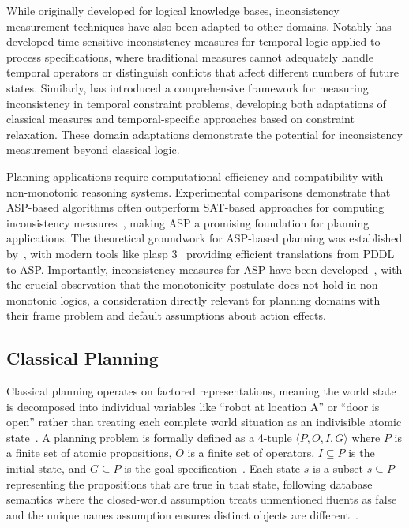 \documentclass[proposal,english,palatino]{AIGpaper}
\begin{document}
While originally developed for logical knowledge bases, inconsistency measurement techniques have also been adapted to other domains. Notably \cite{Corea2022} has developed time-sensitive inconsistency measures for temporal logic applied to process specifications, where traditional measures cannot adequately handle temporal operators or distinguish conflicts that affect different numbers of future states. Similarly, \cite{Condotta2024} has introduced a comprehensive framework for measuring inconsistency in temporal constraint problems, developing both adaptations of classical measures and temporal-specific approaches based on constraint relaxation. These domain adaptations demonstrate the potential for inconsistency measurement beyond classical logic.

Planning applications require computational efficiency and compatibility with non-monotonic reasoning systems. Experimental comparisons demonstrate that \ac{ASP}-based algorithms often outperform \ac{SAT}-based approaches for computing inconsistency measures~\cite{Kuhlmann2025}, making \ac{ASP} a promising foundation for planning applications. The theoretical groundwork for \ac{ASP}-based planning was established by~\cite{Dimopoulos1997}, with modern tools like plasp 3~\cite{Dimopoulos2019} providing efficient translations from \ac{PDDL} to \ac{ASP}. Importantly, inconsistency measures for \ac{ASP} have been developed~\cite{Ulbricht2016}, with the crucial observation that the monotonicity postulate does not hold in non-monotonic logics, a consideration directly relevant for planning domains with their frame problem and default assumptions about action effects.

\subsection{Classical Planning}

Classical planning operates on factored representations, meaning the world state is decomposed into individual variables like ``robot at location A'' or ``door is open'' rather than treating each complete world situation as an indivisible atomic state~\cite{Russell2016}. A planning problem is formally defined as a 4-tuple $\langle P, O, I, G \rangle$ where $P$ is a finite set of atomic propositions, $O$ is a finite set of operators, $I \subseteq P$ is the initial state, and $G \subseteq P$ is the goal specification~\cite{Bylander1994}. Each state $s$ is a subset $s \subseteq P$ representing the propositions that are true in that state, following database semantics where the closed-world assumption treats unmentioned fluents as false and the unique names assumption ensures distinct objects are different~\cite{Russell2016}.
\end{document}
